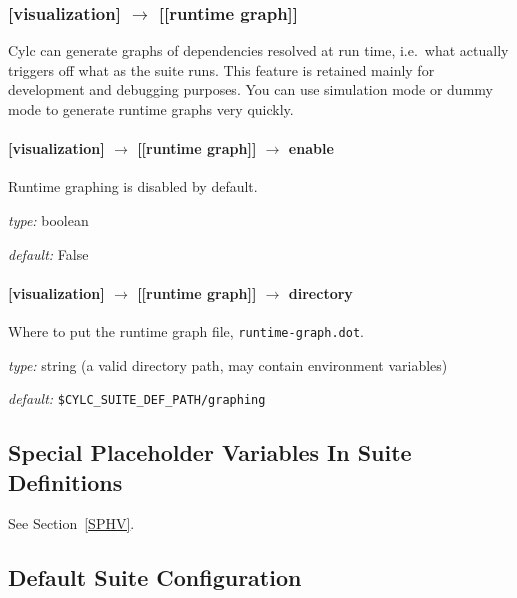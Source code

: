 \subsubsection[{[[}runtime graph{]]}]{[visualization] $\rightarrow$ [[runtime graph]]}

Cylc can generate graphs of dependencies resolved at run time, i.e.\ what
actually triggers off what as the suite runs. This feature is retained
mainly for development and debugging purposes. You can use simulation
mode or dummy mode to generate runtime graphs very quickly.

\paragraph[enable]{[visualization] $\rightarrow$ [[runtime graph]] $\rightarrow$ enable}

Runtime graphing is disabled by default.
\begin{myitemize}
    \item {\em type:} boolean
    \item {\em default:} False
\end{myitemize}

\paragraph[directory]{[visualization] $\rightarrow$ [[runtime graph]] $\rightarrow$ directory}

Where to put the runtime graph file, \lstinline=runtime-graph.dot=.

\begin{myitemize}
    \item {\em type:} string (a valid directory path, may contain environment variables)
    \item {\em default:} \lstinline=$CYLC_SUITE_DEF_PATH/graphing=
\end{myitemize}


\subsection{Special Placeholder Variables In Suite Definitions}

See Section~\ref{SPHV}.


\subsection{Default Suite Configuration}
\label{SuiteDefaults}

